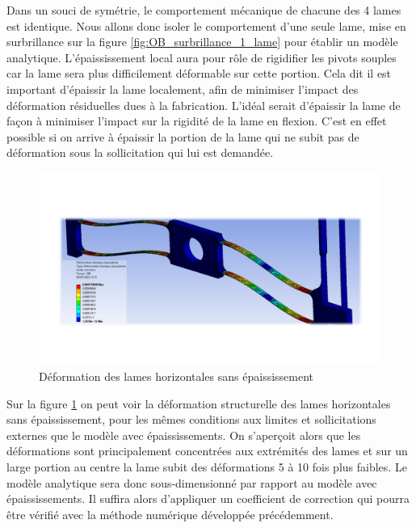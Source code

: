 Dans un souci de symétrie, le comportement mécanique de chacune des 4 lames est identique. Nous allons donc isoler le comportement d'une seule lame, mise en surbrillance sur la figure \ref{fig:OB_surbrillance_1_lame} pour établir un modèle analytique.
L'épaississement local aura pour rôle de rigidifier les pivots souples car la lame sera plus difficilement déformable sur cette portion. Cela dit il est important d'épaissir la lame localement, afin de minimiser l'impact des déformation résiduelles dues à la fabrication. L'idéal serait d'épaissir la lame de façon à minimiser l'impact sur la rigidité de la lame en flexion. C'est en effet possible si on arrive à épaissir la portion de la lame qui ne subit pas de déformation sous la sollicitation qui lui est demandée.
\begin{figure}[!htbp]
\begin{center}
    \captionsetup{justification=centering}
	\includegraphics[trim={2cm 4cm 2cm 4cm},clip, width=\textwidth]{../Chap3/Figure/ANSYS_deformation.pdf}
	\caption{Déformation des lames horizontales sans épaississement}
	\label{fig:ANSYS_deformation}
\end{center}
\end{figure}

Sur la figure \ref{fig:ANSYS_deformation} on peut voir la déformation structurelle des lames horizontales sans épaississement, pour les mêmes conditions aux limites et sollicitations externes que le modèle avec épaississements. On s'aperçoit alors que les déformations sont principalement concentrées aux extrémités des lames et sur un large portion au centre la lame subit des déformations 5 à 10 fois plus faibles. Le modèle analytique sera donc sous-dimensionné par rapport au modèle avec épaississements. Il suffira alors d'appliquer un coefficient de correction qui pourra être vérifié avec la méthode numérique développée précédemment.

